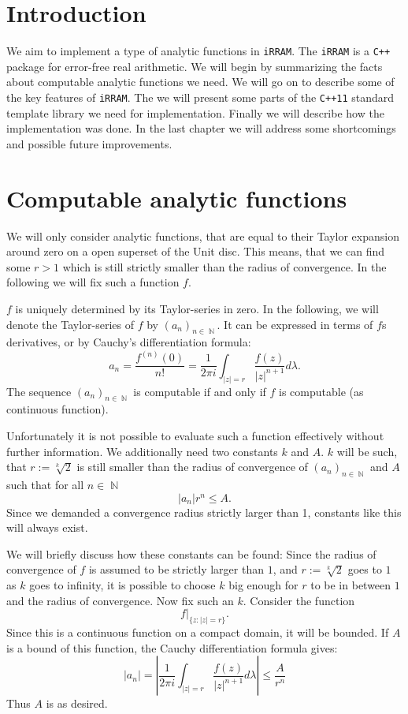 \documentclass{article}
\DeclareMathOperator{\NN}{\ensuremath{\mathbb{N}}\xspace}
\newcommand{\irram}{\texttt{iRRAM}\xspace}
\newcommand{\cc}{\texttt{C++}\xspace}
\newcommand{\ccOx}{\texttt{C++11}\xspace}
\begin{document}
\tableofcontents
\setcounter{section}{-1}
\section{Introduction}

We aim to implement a type of analytic functions in \irram. The \irram is a \cc package for error-free real arithmetic. We will begin by summarizing the facts about computable analytic functions we need. We will go on to describe some of the key features of \irram. The we will present some parts of the \ccOx standard template library we need for implementation. Finally we will describe how the implementation was done. In the last chapter we will address some shortcomings and possible future improvements.

\section{Computable analytic functions}

We will only consider analytic functions, that are equal to their Taylor expansion around zero on a open superset of the Unit disc. This means, that we can find some $r>1$ which is still strictly smaller than the radius of convergence. In the following we will fix such a function $f$.

$f$ is uniquely determined by its Taylor-series in zero. In the following, we will denote the Taylor-series of $f$ by $(a_n)_{n\in \NN}$. It can be expressed in terms of $f$s derivatives, or by Cauchy's differentiation formula:
\[ a_n = \frac{f^{(n)}(0)}{n!} = \frac 1 {2\pi i}\int_{|z| = r} \frac{f(z)}{|z|^{n+1}} d\lambda. \]
The sequence $(a_n)_{n\in \NN}$ is computable if and only if $f$ is computable (as continuous function). 

Unfortunately it is not possible to evaluate such a function effectively without further information. We additionally need two constants $k$ and $A$. $k$ will be such, that $r:=\sqrt[k]{2}$ is still smaller than the radius of convergence of $(a_n)_{n\in \NN}$ and $A$ such that for all $n\in \NN$
\[ |a_n|  r^n \leq A. \]
Since we demanded a convergence radius strictly larger than 1, constants like this will always exist.

We will briefly discuss how these constants can be found: Since the radius of convergence of $f$ is assumed to be strictly larger than $1$, and $r:=\sqrt[k] 2$ goes to $1$ as $k$ goes to infinity, it is possible to choose $k$ big enough for $r$ to be in between $1$ and the radius of convergence. Now fix such an $k$. Consider the function
\[ f|_{\{z:|z| = r\}}. \]
Since this is a continuous function on a compact domain, it will be bounded. If $A$ is a bound of this function, the Cauchy differentiation formula gives:
\[ |a_n |=  \left|\frac 1 {2\pi i}\int_{|z| = r} \frac{f(z)}{|z|^{n+1}} d\lambda\right| \leq \frac A {r^n} \]
Thus $A$ is as desired.
\end{document}
